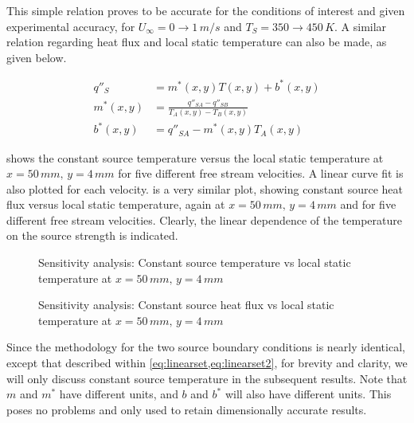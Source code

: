 \documentclass[preprint,12pt]{elsarticle}
\begin{document}
This simple relation proves to be accurate for the conditions of interest and given experimental accuracy, for $U_{\infty}=0\rightarrow 1 \, m/s$ and $T_S=350\rightarrow 450 \, K$.  A similar relation regarding heat flux and local static temperature can also be made, as given below.

\begin{subequations}
\label{eq:linearset2}
\begin{align}
q''_{S} &= m^{\ast}\left( x,y \right) T\left( x,y \right) + b^{\ast}\left( x,y \right) \label{eq:linear2} \\
m^{\ast}\left( x,y \right) &= \frac{q''_{SA} - q''_{SB}}{T_A \left( x,y \right) - T_B\left( x,y \right)} \label{eq:m2} \\
b^{\ast}\left( x,y \right) &= q''_{SA} - m^{\ast}\left( x,y \right) T_A \left( x,y \right) \label{eq:b2}
\end{align}
\end{subequations}

 shows the constant source temperature versus the local static temperature at $x=50\, mm,\, y=4\, mm$ for five different free stream velocities.  A linear curve fit is also plotted for each velocity.   is a very similar plot, showing constant source heat flux versus local static temperature, again at $x=50\, mm,\, y=4\, mm$ and for five different free stream velocities.  Clearly, the linear dependence of the temperature on the source strength is indicated.

\begin{figure}[!htbp]
	\centering
	\setlength\figureheight{6cm} 
	\setlength\figurewidth{6cm}
	
	\caption{Sensitivity analysis: Constant source temperature vs local static temperature at $x=50\, mm,\, y=4\, mm$}
	\label{fig:SATemp}
\end{figure}


\begin{figure}[!htbp]
	\centering
	\setlength\figureheight{6cm} 
	\setlength\figurewidth{6cm}
	
	\caption{Sensitivity analysis: Constant source heat flux vs local static temperature at $x=50\, mm,\, y=4\, mm$}
	\label{fig:SAFlux}
\end{figure}

Since the methodology for the two source boundary conditions is nearly identical, except that described within \cref{eq:linearset,eq:linearset2}, for brevity and clarity, we will only discuss constant source temperature in the subsequent results.  Note that $m$ and $m^{\ast}$ have different units, and $b$ and $b^{\ast}$ will also have different units.  This poses no problems and only used to retain dimensionally accurate results.
\end{document}

